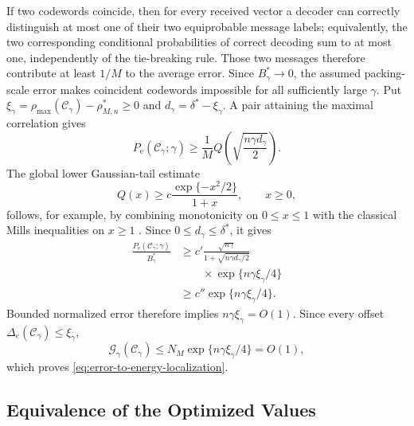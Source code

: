 \documentclass[12pt,draftclsnofoot,onecolumn]{IEEEtran}
\newcommand{\cC}{\mathcal{C}}
\newcommand{\cG}{\mathcal{G}}
\newcommand{\Pe}{P_{\mathrm e}}
\newcommand{\Qfun}{Q}
\theoremstyle{definition}
\begin{document}
\begin{IEEEproof}
If two codewords coincide, then for every received vector a decoder can
correctly distinguish at most one of their two equiprobable message
labels; equivalently, the two corresponding conditional probabilities
of correct decoding sum to at most one, independently of the tie-breaking
rule.  Those two messages therefore contribute at least \(1/M\) to the
average error.  Since \(B_\gamma^{\ast}\to0\), the assumed packing-scale
error makes coincident codewords impossible for all sufficiently large
\(\gamma\).  Put
\(\xi_\gamma=\rho_{\max}(\cC_\gamma)-\rho^{\ast}_{M,n}\ge0\) and
\(d_\gamma=\delta^{\ast}-\xi_\gamma\).  A pair attaining the maximal
correlation gives
\begin{equation*}
  \Pe(\cC_\gamma;\gamma)
  \ge\frac1M\Qfun\left(\sqrt{\frac{n\gamma d_\gamma}{2}}\right).
\end{equation*}
The global lower Gaussian-tail estimate
\begin{equation*}
  \Qfun(x)\ge c\frac{\exp\{-x^2/2\}}{1+x},
  \qquad x\ge0,
\end{equation*}
follows, for example, by combining monotonicity on \(0\le x\le1\)
with the classical Mills inequalities on \(x\ge1\)
\cite{Gordon1941}.  Since \(0\le d_\gamma\le\delta^{\ast}\), it gives
\begin{equation*}
\begin{aligned}
  \frac{\Pe(\cC_\gamma;\gamma)}{B_\gamma^{\ast}}
  &\ge c'\frac{\sqrt{n\gamma}}
  {1+\sqrt{n\gamma d_\gamma/2}}\\
  &\qquad\times\exp\{n\gamma\xi_\gamma/4\}\\
  &\ge c''\exp\{n\gamma\xi_\gamma/4\}.
\end{aligned}
\end{equation*}
Bounded normalized error therefore implies
\(n\gamma\xi_\gamma=O(1)\).  Since every offset
\(\Delta_e(\cC_\gamma)\le\xi_\gamma\),
\begin{equation*}
  \cG_\gamma(\cC_\gamma)
  \le N_M\exp\{n\gamma\xi_\gamma/4\}=O(1),
\end{equation*}
which proves \eqref{eq:error-to-energy-localization}.
\end{IEEEproof}

\subsection{Equivalence of the Optimized Values}
\end{document}
